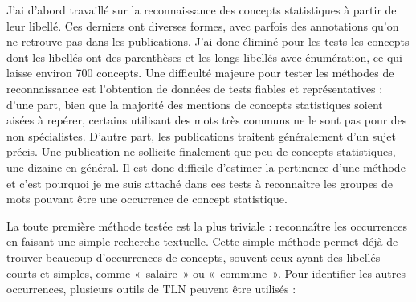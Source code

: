 J'ai d'abord travaillé sur la reconnaissance des concepts statistiques à partir de leur libellé. Ces derniers ont diverses formes, avec parfois des annotations qu'on ne retrouve pas dans les publications. J'ai donc éliminé pour les tests les concepts dont les libellés ont des parenthèses et les longs libellés avec énumération, ce qui laisse environ 700 concepts. Une difficulté majeure pour tester les méthodes de reconnaissance est l'obtention de données de tests fiables et représentatives : d'une part, bien que la majorité des mentions de concepts statistiques soient aisées à repérer, certains utilisant des mots très communs ne le sont pas pour des non spécialistes. D'autre part, les publications traitent généralement d'un sujet précis. Une publication ne sollicite finalement que peu de concepts statistiques, une dizaine en général. Il est donc difficile d'estimer la pertinence d'une méthode et c'est pourquoi je me suis attaché dans ces tests à reconnaître les groupes de mots pouvant être une occurrence de concept statistique.
\newline


La toute première méthode testée est la plus triviale : reconnaître les occurrences en faisant une simple recherche textuelle. Cette simple méthode permet déjà de trouver beaucoup d'occurrences de concepts, souvent ceux ayant des libellés courts et simples, comme «~salaire~» ou «~commune~». Pour identifier les autres occurrences, plusieurs outils de TLN peuvent être utilisés :
\newline

